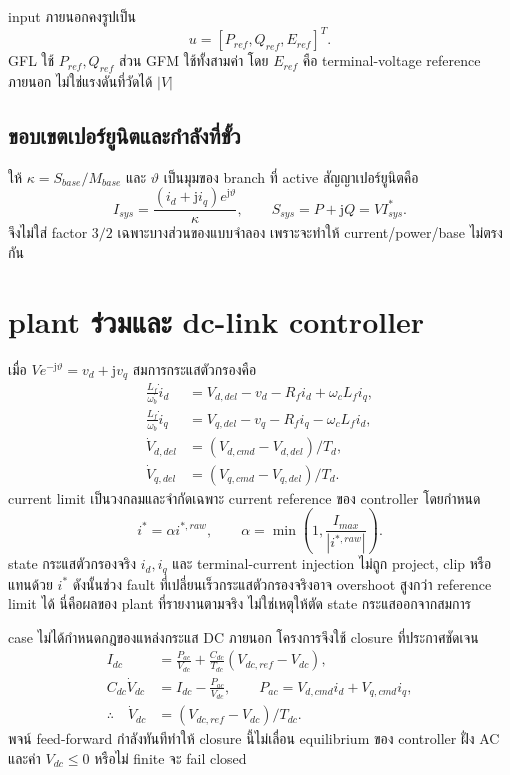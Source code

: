 \documentclass[12pt,a4paper]{article}
\begin{document}
input ภายนอกคงรูปเป็น
\begin{equation}
u=[P_{ref},Q_{ref},E_{ref}]^T .
\end{equation}
GFL ใช้ $P_{ref},Q_{ref}$ ส่วน GFM ใช้ทั้งสามค่า โดย $E_{ref}$ คือ terminal-voltage reference ภายนอก
ไม่ใช่แรงดันที่วัดได้ $|V|$

\subsection{ขอบเขตเปอร์ยูนิตและกำลังที่ขั้ว}

ให้ $\kappa=S_{base}/M_{base}$ และ $\vartheta$ เป็นมุมของ branch ที่ active สัญญาเปอร์ยูนิตคือ
\begin{equation}
I_{sys}=\frac{(i_d+\mathrm{j}i_q)e^{\mathrm{j}\vartheta}}{\kappa},\qquad
S_{sys}=P+\mathrm{j}Q=V I_{sys}^{*}.
\label{eq:power-th}
\end{equation}
จึงไม่ใส่ factor $3/2$ เฉพาะบางส่วนของแบบจำลอง เพราะจะทำให้ current/power/base ไม่ตรงกัน

\section{plant ร่วมและ dc-link controller}

เมื่อ $Ve^{-\mathrm{j}\vartheta}=v_d+\mathrm{j}v_q$ สมการกระแสตัวกรองคือ
\begin{align}
\frac{L_f}{\omega_b}\dot i_d&=V_{d,del}-v_d-R_fi_d+\omega_cL_fi_q,\\
\frac{L_f}{\omega_b}\dot i_q&=V_{q,del}-v_q-R_fi_q-\omega_cL_fi_d,\\
\dot V_{d,del}&=(V_{d,cmd}-V_{d,del})/T_d,\\
\dot V_{q,del}&=(V_{q,cmd}-V_{q,del})/T_d.
\end{align}
current limit เป็นวงกลมและจำกัดเฉพาะ current reference ของ controller โดยกำหนด
\begin{equation}
i^*=\alpha i^{*,raw},\qquad
\alpha=\min\!\left(1,\frac{I_{max}}{|i^{*,raw}|}\right).
\end{equation}
state กระแสตัวกรองจริง $i_d,i_q$ และ terminal-current injection ไม่ถูก project, clip หรือแทนด้วย $i^*$
ดังนั้นช่วง fault ที่เปลี่ยนเร็วกระแสตัวกรองจริงอาจ overshoot สูงกว่า reference limit ได้ นี่คือผลของ plant
ที่รายงานตามจริง ไม่ใช่เหตุให้ตัด state กระแสออกจากสมการ

case ไม่ได้กำหนดกฎของแหล่งกระแส DC ภายนอก โครงการจึงใช้ closure ที่ประกาศชัดเจน
\begin{align}
I_{dc}&=\frac{P_{ac}}{V_{dc}}+\frac{C_{dc}}{T_{dc}}(V_{dc,ref}-V_{dc}),\\
C_{dc}\dot V_{dc}&=I_{dc}-\frac{P_{ac}}{V_{dc}},\qquad
P_{ac}=V_{d,cmd}i_d+V_{q,cmd}i_q,\\
\therefore\quad \dot V_{dc}&=(V_{dc,ref}-V_{dc})/T_{dc}.
\end{align}
พจน์ feed-forward กำลังทันทีทำให้ closure นี้ไม่เลื่อน equilibrium ของ controller ฝั่ง AC และค่า
$V_{dc}\le0$ หรือไม่ finite จะ fail closed
\end{document}

